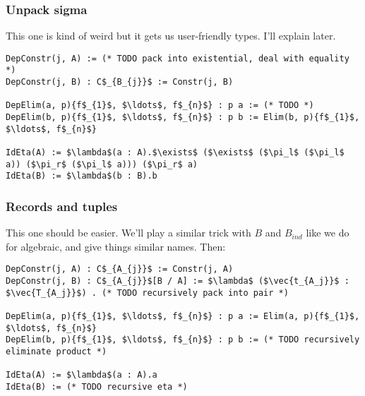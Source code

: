 
\subsubsection{Unpack sigma}

This one is kind of weird but it gets us user-friendly types. I'll explain later.

\begin{lstlisting}
DepConstr(j, A) := (* TODO pack into existential, deal with equality *)
DepConstr(j, B) : C$_{B_{j}}$ := Constr(j, B)

DepElim(a, p){f$_{1}$, $\ldots$, f$_{n}$} : p a := (* TODO *)
DepElim(b, p){f$_{1}$, $\ldots$, f$_{n}$} : p b := Elim(b, p){f$_{1}$, $\ldots$, f$_{n}$}

IdEta(A) := $\lambda$(a : A).$\exists$ ($\exists$ ($\pi_l$ ($\pi_l$ a)) ($\pi_r$ ($\pi_l$ a))) ($\pi_r$ a)
IdEta(B) := $\lambda$(b : B).b
\end{lstlisting}

\subsubsection{Records and tuples}

This one should be easier. We'll play a similar trick with $B$ and $B_{ind}$ like we do for algebraic,
and give things similar names.
Then:

\begin{lstlisting}
DepConstr(j, A) : C$_{A_{j}}$ := Constr(j, A)
DepConstr(j, B) : C$_{A_{j}}$[B / A] := $\lambda$ ($\vec{t_{A_j}}$ : $\vec{T_{A_j}}$) . (* TODO recursively pack into pair *)

DepElim(a, p){f$_{1}$, $\ldots$, f$_{n}$} : p a := Elim(a, p){f$_{1}$, $\ldots$, f$_{n}$}
DepElim(b, p){f$_{1}$, $\ldots$, f$_{n}$} : p b := (* TODO recursively eliminate product *)

IdEta(A) := $\lambda$(a : A).a
IdEta(B) := (* TODO recursive eta *)
\end{lstlisting}
